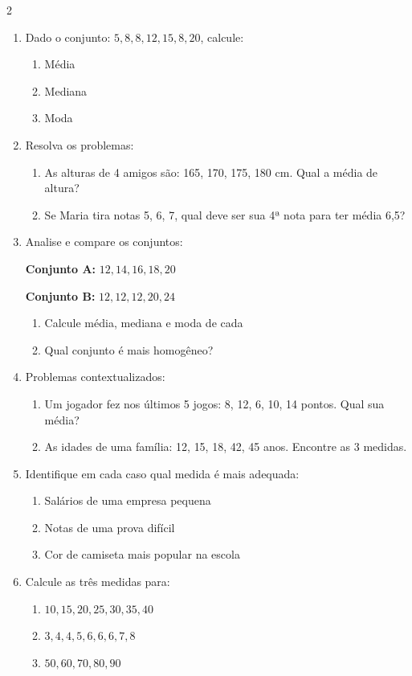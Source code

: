 \documentclass[11pt]{article}
\begin{document}
\begin{multicols}{2}
\begin{enumerate}[leftmargin=*]
\item Dado o conjunto: $5, 8, 8, 12, 15, 8, 20$, calcule:
\begin{enumerate}[label=\alph*)]
\item Média
\item Mediana
\item Moda
\end{enumerate}

\item Resolva os problemas:
\begin{enumerate}[label=\alph*)]
\item As alturas de 4 amigos são: 165, 170, 175, 180 cm. Qual a média de altura?
\item Se Maria tira notas 5, 6, 7, qual deve ser sua 4ª nota para ter média 6,5?
\end{enumerate}

\item Analise e compare os conjuntos:

\textbf{Conjunto A:} $12, 14, 16, 18, 20$

\textbf{Conjunto B:} $12, 12, 12, 20, 24$

\begin{enumerate}[label=\alph*)]
\item Calcule média, mediana e moda de cada
\item Qual conjunto é mais homogêneo?
\end{enumerate}

\item Problemas contextualizados:
\begin{enumerate}[label=\alph*)]
\item Um jogador fez nos últimos 5 jogos: 8, 12, 6, 10, 14 pontos. Qual sua média?
\item As idades de uma família: 12, 15, 18, 42, 45 anos. Encontre as 3 medidas.
\end{enumerate}

\item Identifique em cada caso qual medida é mais adequada:
\begin{enumerate}[label=\alph*)]
\item Salários de uma empresa pequena
\item Notas de uma prova difícil
\item Cor de camiseta mais popular na escola
\end{enumerate}

\item Calcule as três medidas para:
\begin{enumerate}[label=\alph*)]
\item $10, 15, 20, 25, 30, 35, 40$
\item $3, 4, 4, 5, 6, 6, 6, 7, 8$
\item $50, 60, 70, 80, 90$
\end{enumerate}



\end{enumerate}
\end{multicols}
\end{document}
